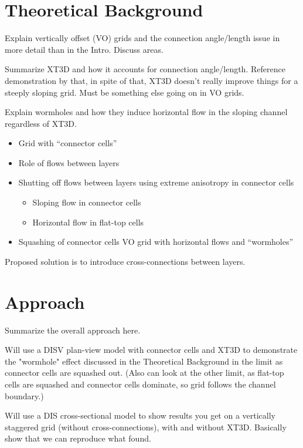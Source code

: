 \documentclass{article}
\begin{document}
\section{Theoretical Background}

Explain vertically offset (VO) grids and the connection angle/length issue in more detail than in the Intro. Discuss areas.

Summarize XT3D and how it accounts for connection angle/length.  Reference demonstration by \cite{bardot2022} that, in spite of that, XT3D doesn’t really improve things for a steeply sloping grid.  Must be something else going on in VO grids.

Explain wormholes and how they induce horizontal flow in the sloping channel regardless of XT3D.
\begin{itemize}
	\item Grid with “connector cells”
	\item Role of flows between layers
	\item Shutting off flows between layers using extreme anisotropy in connector cells
	\begin{itemize}
		\item Sloping flow in connector cells
		\item Horizontal flow in flat-top cells
	\end{itemize}
	\item Squashing of connector cells VO grid with horizontal flows and “wormholes”
\end{itemize}

Proposed solution is to introduce cross-connections between layers.

\section{Approach}

Summarize the overall approach here.

Will use a DISV plan-view model with connector cells and XT3D to demonstrate the "wormhole" effect discussed in the Theoretical Background in the limit as connector cells are squashed out. (Also can look at the other limit, as flat-top cells are squashed and connector cells dominate, so grid follows the channel boundary.)

Will use a DIS cross-sectional model to show results you get on a vertically staggered grid (without cross-connections), with and without XT3D. Basically show that we can reproduce what \cite{bardot2022} found.
\end{document}
